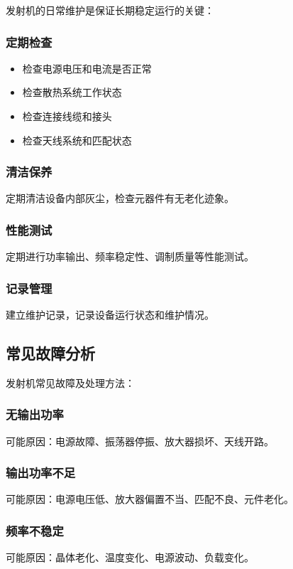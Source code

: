 \documentclass[12pt,UTF8]{ctexbook}
\begin{document}
发射机的日常维护是保证长期稳定运行的关键：

\subsubsection{定期检查}
\begin{itemize}[leftmargin=3.5em]
    \item 检查电源电压和电流是否正常
    \item 检查散热系统工作状态
    \item 检查连接线缆和接头
    \item 检查天线系统和匹配状态
\end{itemize}

\subsubsection{清洁保养}
定期清洁设备内部灰尘，检查元器件有无老化迹象。

\subsubsection{性能测试}
定期进行功率输出、频率稳定性、调制质量等性能测试。

\subsubsection{记录管理}
建立维护记录，记录设备运行状态和维护情况。

\subsection{常见故障分析}

发射机常见故障及处理方法：

\subsubsection{无输出功率}
可能原因：电源故障、振荡器停振、放大器损坏、天线开路。

\subsubsection{输出功率不足}
可能原因：电源电压低、放大器偏置不当、匹配不良、元件老化。

\subsubsection{频率不稳定}
可能原因：晶体老化、温度变化、电源波动、负载变化。
\end{document}
